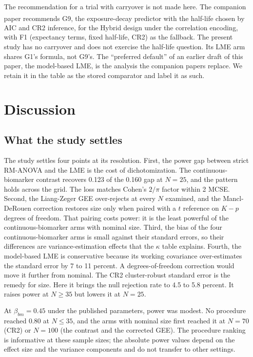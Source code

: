 \documentclass[
  11pt,
]{article}
\begin{document}
The recommendation for a trial with carryover is not made here. The
companion paper\textsuperscript{} recommends G9, the
exposure-decay predictor with the half-life chosen by AIC and CR2
inference, for the Hybrid design under the correlation encoding,
with F1 (expectancy terms, fixed half-life, CR2) as the fallback.
The present study has no carryover and does not exercise the
half-life question. Its LME arm shares G1's formula, not G9's. The
``preferred default'' of an earlier draft of this paper, the
model-based LME, is the analysis the companion papers replace. We
retain it in the table as the stored comparator and label it as
such.

\section{Discussion}\label{sec-discussion}

\subsection{What the study settles}\label{what-the-study-settles}

The study settles four points at its resolution. First, the power
gap between strict RM-ANOVA and the LME is the cost of
dichotomization. The continuous-biomarker contrast recovers
0.123 of the 0.160
gap at \(N = 25\), and the pattern holds across the grid. The loss
matches Cohen's \(2/\pi\) factor within 2 MCSE. Second, the
Liang-Zeger GEE over-rejects at every \(N\) examined, and the
Mancl-DeRouen correction restores size only when paired with a \(t\)
reference on \(K - p\) degrees of freedom. That pairing costs power:
it is the least powerful of the continuous-biomarker arms with
nominal size. Third, the bias of the four continuous-biomarker arms
is small against their standard errors, so their differences are
variance-estimation effects that the \(\kappa\) table explains.
Fourth, the model-based LME is conservative because its working
covariance over-estimates the standard error by
7 to 11
percent. A degrees-of-freedom correction would move it further from
nominal. The CR2 cluster-robust standard error is the remedy for
size. Here it brings the null rejection rate to
4.5 to 5.8 percent. It raises power at
\(N \ge 35\) but lowers it at \(N = 25\).

At \(\beta_{bm} = 0.45\) under the published parameters, power was
modest. No procedure reached 0.80 at \(N \le 35\), and the arms with
nominal size first reached it at \(N = 70\) (CR2) or \(N = 100\) (the
contrast and the corrected GEE). The procedure ranking is
informative at these sample sizes; the absolute power values depend
on the effect size and the variance components and do not transfer
to other settings.
\end{document}
